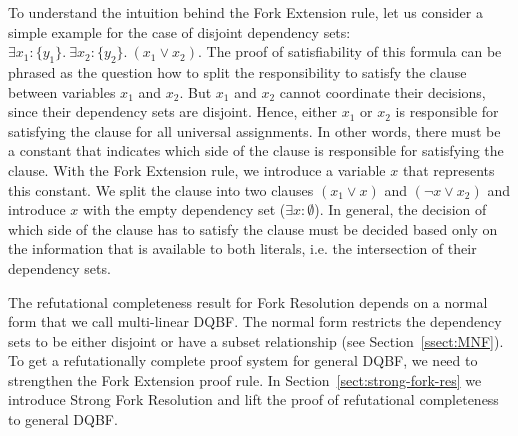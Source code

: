 \documentclass{svjour3}
\begin{document}
To understand the intuition behind the Fork Extension rule, let us consider a simple example for the case of disjoint dependency sets: $\exists x_1: \{y_1\}.~\exists x_2:\{y_2\}.~(x_1\vee x_2)$.
The proof of satisfiability of this formula can be phrased as the question how to split the responsibility to satisfy the clause between variables $x_1$ and $x_2$.
But $x_1$ and $x_2$ cannot coordinate their decisions, since their dependency sets are disjoint.
Hence, either $x_1$ or $x_2$ is responsible for satisfying the clause for all universal assignments.
In other words, there must be a constant that indicates which side of the clause is responsible for satisfying the clause. 
%
With the Fork Extension rule, we introduce a variable $x$ that represents this constant. 
We split the clause into two clauses $(x_1\vee x)$ and $(\neg x \vee x_2)$ and introduce $x$ with the empty dependency set ($\exists x:\emptyset$). 
%
In general, the decision of which side of the clause has to satisfy the clause must be decided based only on the information that is available to both literals, i.e. the intersection of their dependency sets.

The refutational completeness result for Fork Resolution depends on a normal form that we call multi-linear DQBF.
The normal form restricts the dependency sets to be either disjoint or have a subset relationship (see Section~\ref{ssect:MNF}).
To get a refutationally complete proof system for general DQBF, we need to strengthen the Fork Extension proof rule.
In Section~\ref{sect:strong-fork-res} we introduce Strong Fork Resolution and lift the proof of refutational completeness to general DQBF.
\end{document}
